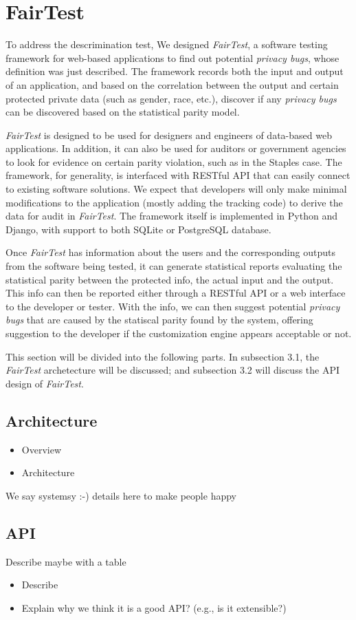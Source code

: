 \section{FairTest}
\label{sect:fairtest}


To address the descrimination test, We designed \textit{FairTest}, a software
testing framework for web-based applications to find out potential
\textit{privacy bugs}, whose definition was just described. The framework
records both the input and output of an application, and based on the
correlation between the output and certain protected private data (such as
gender, race, etc.), discover if any \textit{privacy bugs} can be discovered 
based on the statistical parity model.


\textit{FairTest} is designed to be used for designers and engineers of 
data-based web applications. In addition, it can also be used for auditors 
or government agencies to look for evidence on certain parity violation,
such as in the Staples case. The framework, for generality, is interfaced 
with RESTful API that can easily connect to existing software solutions.
We expect that developers will only make minimal modifications to the
application (mostly adding the tracking code) to derive the data for audit
in \textit{FairTest}. The framework itself is implemented in Python and
Django, with support to both SQLite or PostgreSQL database.


Once \textit{FairTest} has information about the users and the corresponding
outputs from the software being tested, it can generate statistical reports
evaluating the statistical parity between the protected info, the actual
input and the output. This info can then be reported either through a RESTful
API or a web interface to the developer or tester. With the info, we can then
suggest potential \textit{privacy bugs} that are caused by the statiscal
parity found by the system, offering suggestion to the developer if the
customization engine appears acceptable or not.


This section will be divided into the following parts. In subsection 3.1, the
\textit{FairTest} archetecture will be discussed; and subsection 3.2 will
discuss the API design of \textit{FairTest}. 

\subsection{Architecture}
\begin{itemize}
  \item Overview
  \item Architecture
\end{itemize}
We say systemsy :-) details here to make people happy
 

\subsection{API}
Describe maybe with a table
\begin{itemize}
  \item Describe
  \item Explain why we think it is a good API? (e.g., is it extensible?)
\end{itemize}
